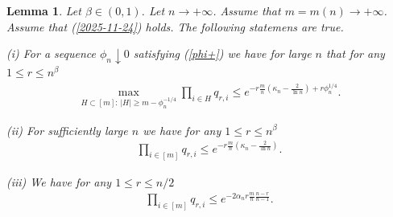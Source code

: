 \documentclass[11pt, a4paper]{article}
\newtheorem{lem}{Lemma}
\begin{document}
\begin{lem}\label{q-bounds}
Let $\beta\in(0,1)$.
Let $n\to+\infty$. Assume that $m=m(n)\to+\infty$.
Assume that 
(\ref{2025-11-24}) holds. 
The following statemens are true.

(i) For a sequence $\phi_n\downarrow 0$ satisfying (\ref{phi+})
we have for large $n$ that for any $1\le r\le n^{\beta}$
\begin{align}
\label{2025-11-27+6}
\max_
{H\subset [m]:\, |H|\ge m-\phi_n^{-1/4}}
\prod_{i\in H} q_{r,i}
\le 
e^{-r\frac{m}{n}\left(\kappa_n-\frac{2}{\ln n}\right)+r\phi_n^{1/4}}.
\end{align}

(ii) For sufficiently large $n$ we have for any 
$1\le r\le n^{\beta}$
\begin{align}\nonumber
\prod_{i\in [m]} q_{r,i}
\le 
e^{-r\frac{m}{n}\left(\kappa_n-\frac{2}{\ln n}\right)}.
\end{align}

(iii) We have for any 
$1\le r\le n/2$
\begin{align}
\nonumber
\prod_{i\in [m]} q_{r,i}
\le 
e^{-2\alpha_nr\frac{m}{n}\frac{n-r}{n-1}}.
\end{align}
\end{lem}
\end{document}
